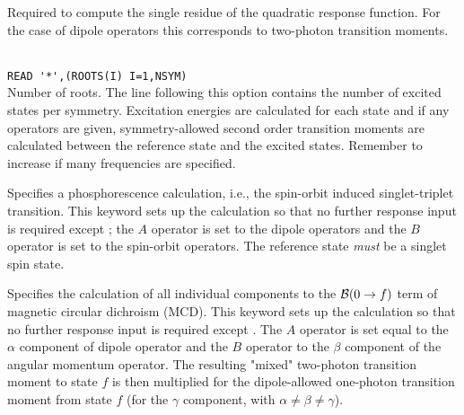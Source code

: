 \begin{description}

\item{}
Required to
compute the single residue of the quadratic
response function.
For the case of dipole operators this corresponds to two-photon
transition
moments.

\item{}\\
\verb|READ '*',(ROOTS(I) I=1,NSYM)|\\
Number of roots.  The line following this option contains the number
of excited states per symmetry. Excitation
energies are calculated for each state and if
any operators are given, 
symmetry-allowed second order transition moments are
calculated between the 
reference state and the excited states.
Remember to increase  if many frequencies are specified.

\item{}
Specifies a phosphorescence calculation, i.e.,
the spin-orbit 
induced singlet-triplet transition. This keyword sets up the  
calculation so that no further response input is required except ; the
$A$ operator is set to the dipole operators and
the $B$ operator  
is set to the spin-orbit
operators. \cite{ovhapjhjajthjojcp97,haovbmaqc27} 
The reference state {\em must} be a singlet spin state.

\item{}
Specifies the calculation of all individual components to the 
${\cal{B}}(0\to f)$ term of magnetic circular dichroism
(MCD).
This keyword sets up the calculation so that no further response input is required except . 
The $A$ operator is set equal to the $\alpha$ component of dipole 
operator and
the $B$ operator to the $\beta$ component of the angular momentum
operator. The resulting "mixed" two-photon transition moment to state $f$ 
is then multiplied for the dipole-allowed one-photon transition moment 
from state $f$ (for the $\gamma$ component, with $\alpha \neq \beta \neq \gamma$).
\cite{Coriani:MCDRSP} 


\end{description}
